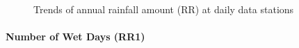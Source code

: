 \begin{figure}[htbp]

  \caption{Trends of annual rainfall amount (RR) at daily data stations}
  \label{fig:FF_annual_RR}
\end{figure}

\paragraph{Number of Wet Days (RR1)}
\label{sec:NumberOfRaindaysRR1}

